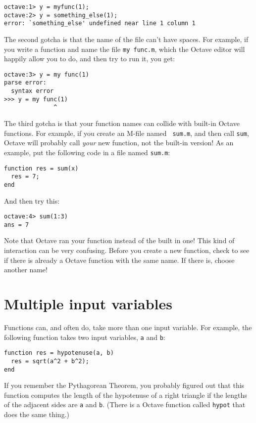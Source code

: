 \begin{verbatim}
octave:1> y = myfunc(1);
octave:2> y = something_else(1);
error: `something_else' undefined near line 1 column 1
\end{verbatim}

The second gotcha is that the name of the file can't have spaces.
For example, if you write a function and name the file {\tt my func.m},
which the Octave editor will happily allow you to do, and then
try to run it, you get:

\begin{verbatim}
octave:3> y = my func(1)
parse error:
  syntax error
>>> y = my func(1)
              ^
\end{verbatim}

The third gotcha is that your function names can collide with built-in
Octave functions. For example, if you create an M-file named {\tt
sum.m}, and then call {\tt sum}, Octave will probably call {\em your} new
function, not the built-in version! As an example, put the following
code in a file named {\tt sum.m}:

\begin{verbatim}
function res = sum(x)
  res = 7;
end
\end{verbatim}

And then try this:

\begin{verbatim}
octave:4> sum(1:3)
ans = 7
\end{verbatim}

Note that Octave ran your function instead of the built in one! This kind of
interaction can be very
confusing. Before you create a new function, check to see if there is
already a Octave function with the same name. If there is, choose
another name!


\section{Multiple input variables}
\label{hypotenuse}

Functions can, and often do, take more than one input variable.
For example, the following function takes two input variables,
{\tt a} and {\tt b}:

\begin{verbatim}
function res = hypotenuse(a, b)
  res = sqrt(a^2 + b^2);
end
\end{verbatim}

If you remember the Pythagorean Theorem, you probably figured out
that this function computes the length of the hypotenuse of a right
triangle if the lengths of the adjacent sides are {\tt a}
and {\tt b}. (There is a Octave function called {\tt hypot} that does
the same thing.)

